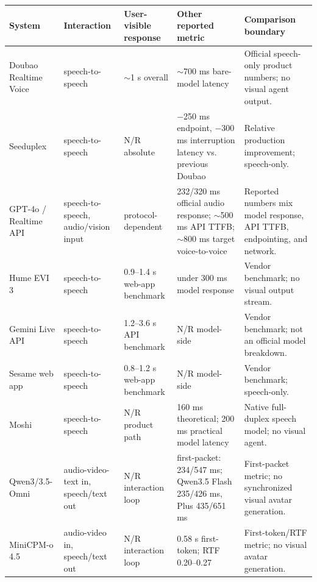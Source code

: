 \documentclass{llmxive}
\providecommand{\arraystretch}{1.04}
\begin{document}
\begin{table}[!t]
    \centering
    \scriptsize
    \setlength{\tabcolsep}{3pt}
    \renewcommand{\arraystretch}{1.04}
    \begin{tabularx}{\textwidth}{@{}L{.16\textwidth}L{.15\textwidth}L{.20\textwidth}L{.22\textwidth}Y@{}}
        \toprule
        System & Interaction & User-visible response & Other reported metric & Comparison boundary \\
        \midrule
        Doubao Realtime Voice~\citep{doubao_realtime_voice2025,volcengine_realtime_voice2025} & speech-to-speech & $\sim$1 s overall & $\sim$700 ms bare-model latency & Official speech-only product numbers; no visual agent output. \\
        Seeduplex~\citep{seeduplex2026} & speech-to-speech & N/R absolute & $-$250 ms endpoint, $-$300 ms interruption latency vs. previous Doubao & Relative production improvement; speech-only. \\
        GPT-4o / Realtime API~\citep{openai2024gpt4o,latent2024realtimeapi,hume2025evi3} & speech-to-speech, audio/vision input & protocol-dependent & 232/320 ms official audio response; $\sim$500 ms API TTFB; $\sim$800 ms target voice-to-voice & Reported numbers mix model response, API TTFB, endpointing, and network. \\
        Hume EVI 3~\citep{hume2025evi3} & speech-to-speech & 0.9--1.4 s web-app benchmark & under 300 ms model response & Vendor benchmark; no visual output stream. \\
        Gemini Live API~\citep{hume2025evi3} & speech-to-speech & 1.2--3.6 s API benchmark & N/R model-side & Vendor benchmark; not an official model breakdown. \\
        Sesame web app~\citep{hume2025evi3} & speech-to-speech & 0.8--1.2 s web-app benchmark & N/R model-side & Vendor benchmark; speech-only. \\
        Moshi~\citep{defossez2024moshi} & speech-to-speech & N/R product path & 160 ms theoretical; 200 ms practical model latency & Native full-duplex speech model; no visual agent. \\
        Qwen3/3.5-Omni~\citep{qwen3omni2025,qwen35omni2026} & audio-video-text in, speech/text out & N/R interaction loop & first-packet: 234/547 ms; Qwen3.5 Flash 235/426 ms, Plus 435/651 ms & First-packet metric; no synchronized visual avatar generation. \\
        MiniCPM-o 4.5~\citep{minicpmo45} & audio-video in, speech/text out & N/R interaction loop & 0.58 s first-token; RTF 0.20--0.27 & First-token/RTF metric; no visual avatar generation. \\

\end{tabularx}
\end{table}
\end{document}
